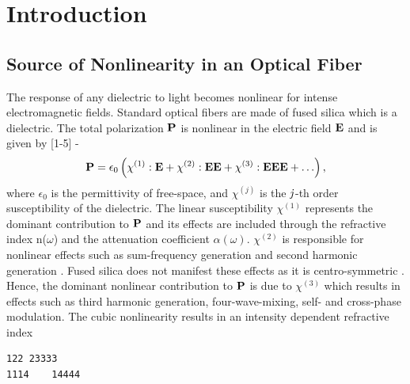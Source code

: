 
\renewcommand{\thechapter}{1}

\chapter{Introduction}

\section{Source of Nonlinearity in an Optical Fiber}

The response of any dielectric to light becomes nonlinear
for intense electromagnetic fields.  Standard optical fibers are made of
fused silica which is a dielectric. The total polarization $\bf{P}$
is nonlinear in the electric field $\bf{E}$ and is given by [1-5] -
\begin{equation}
{\bf P} = \epsilon_{0} \left( \chi^{(1)} : {\bf E} + \chi^{(2)} 
: {\bf EE} + \chi^{(3)} : {\bf EEE} + \ldots \right),
\end{equation}
where $\epsilon_0$ is the permittivity of free-space, and
$\chi^{(j)}$ 
is the ${\it j}$-th order susceptibility of the dielectric. The linear
susceptibility $\chi^{(1)}$ represents the dominant contribution to
$\bf{P}$ and its effects are included through the refractive index
n($\omega$) and the attenuation coefficient $\alpha(\omega)$. $\chi^{(2)}$
is responsible for nonlinear effects such as sum-frequency generation and
second harmonic generation \cite{Agrawal1, Shen}. Fused silica does not
manifest these effects as it is centro-symmetric \cite{Newell}. Hence, the dominant nonlinear
contribution to ${\bf P}$ is due to $\chi^{(3)}$ which results in effects
such as third harmonic generation, four-wave-mixing,  self- and
cross-phase modulation. The cubic nonlinearity results in an intensity
dependent refractive index

\begin{verbatim}
122	23333
1114	14444
\end{verbatim}

